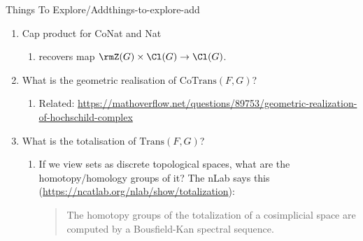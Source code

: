 \begin{remark}{Things To Explore/Add}{things-to-explore-add}
\begin{enumerate}
\begin{enumerate}
                    \[
                        \CoNat(F,H)%
                        \to%
                        \prod_{G\in\Fun(\CatFont{C},\CatFont{D})}\CoNat(G,H)\times\CoNat(F,G)%
                    \]%
                    or of the form
                    \[
                        \CoNat(F,H)%
                        \to%
                        \prod_{G\in\Fun(\CatFont{C},\CatFont{D})}\CoNat(G,H)\icoprod\CoNat(F,G)%
                    \]%
                    for natural cotransformations.
                \item Cap product for CoNat and Nat
                    \begin{enumerate}
                        \item recovers map $\rmZ(G)\times\Cl(G)\to\Cl(G)$.
                    \end{enumerate}
                \item What is the geometric realisation of $\mathrm{CoTrans}(F,G)$?
                    \begin{enumerate}
                        \item Related: \url{https://mathoverflow.net/questions/89753/geometric-realization-of-hochschild-complex}
                    \end{enumerate}
                \item What is the totalisation of $\mathrm{Trans}(F,G)$?
                    \begin{enumerate}
                        \item If we view sets as discrete topological spaces, what are the homotopy/homology groups of it? The nLab says this (\url{https://ncatlab.org/nlab/show/totalization}):
                            \begin{quote}
                                The homotopy groups of the totalization of a cosimplicial space are computed by a Bousfield-Kan spectral sequence.


\end{quote}
\end{enumerate}
\end{enumerate}
\end{enumerate}
\end{remark}
